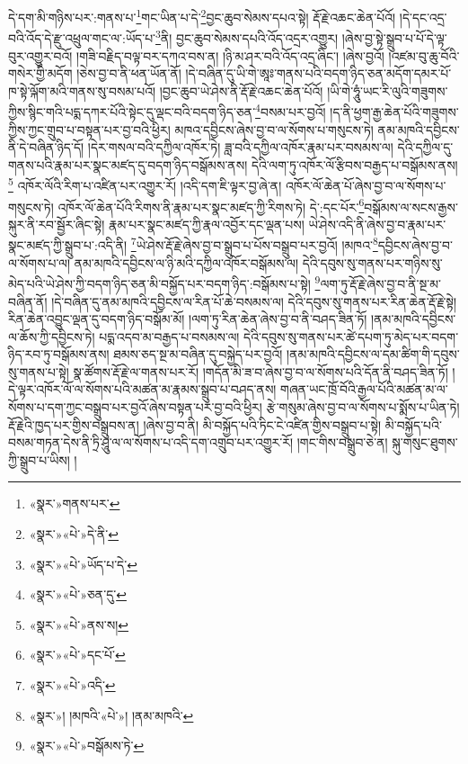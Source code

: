 དེ་དག་མི་གཉིས་པར་:གནས་པ་\footnote{«སྣར་»གནས་པར་}གང་ཡིན་པ་དེ་\footnote{«སྣར་»«པེ་»དེ་ནི་}བྱང་ཆུབ་སེམས་དཔའ་སྟེ། རྡོ་རྗེ་འཆང་ཆེན་པོའོ། །དེ་དང་འདྲ་བའི་འོད་དེ་རྫུ་འཕྲུལ་གང་ལ་:ཡོད་པ་\footnote{«སྣར་»«པེ་»ཡོད་པ་དེ་}ནི། བྱང་ཆུབ་སེམས་དཔའི་འོད་འདྲར་འགྱུར། །ཞེས་བྱ་སྟེ་སྒྲུབ་པ་པོ་དེ་ལྟ་བུར་འགྱུར་བའོ། །གཟི་བརྗིད་བལྟ་བར་དཀའ་བས་ན། །ཉི་མ་ཤར་བའི་འོད་འདྲ་ཞིང་། །ཞེས་བྱའོ། །འཛམ་བུ་ཆུ་བོའི་གསེར་གྱི་མདོག །ཅེས་བྱ་བ་ནི་ཕན་ཡོན་ནོ། །དེ་བཞིན་དུ་ཡི་གེ་ཨཱཿ་གནས་པའི་བདག་ཉིད་ཅན་མདོག་དམར་པོ་ཁ་སྟེ་ལྐོག་མའི་གནས་སུ་བསམ་པའོ། །བྱང་ཆུབ་ཡེ་ཤེས་ནི་རྡོ་རྗེ་འཆང་ཆེན་པོའོ། །ཡི་གེ་ཧཱུཾ་ཡང་རི་ལུའི་གཟུགས་ཀྱིས་སྙིང་གའི་པདྨ་དཀར་པོའི་སྟེང་དུ་ལྡང་བའི་བདག་ཉིད་ཅན་\footnote{«སྣར་»«པེ་»ཅན་དུ་}བསམ་པར་བྱའོ། །ད་ནི་ཕྱག་རྒྱ་ཆེན་པོའི་གཟུགས་ཀྱིས་ཀྱང་གྲུབ་པ་བསྟན་པར་བྱ་བའི་ཕྱིར། མཁའ་དབྱིངས་ཞེས་བྱ་བ་ལ་སོགས་པ་གསུངས་ཏེ། ནམ་མཁའི་དབྱིངས་ནི་དེ་བཞིན་ཉིད་དོ། །དེར་གསལ་བའི་དཀྱིལ་འཁོར་ཏེ། ཟླ་བའི་དཀྱིལ་འཁོར་རྣམ་པར་བསམས་ལ། དེའི་དཀྱིལ་དུ་གནས་པའི་རྣམ་པར་སྣང་མཛད་དུ་བདག་ཉིད་བསྒོམས་ནས། དེའི་ལག་ཏུ་འཁོར་ལོ་རྩིབས་བརྒྱད་པ་བསྒོམས་ནས།\footnote{«སྣར་»«པེ་»ནས་ས།} འཁོར་ལོའི་རིག་པ་འཛིན་པར་འགྱུར་རོ། །འདི་དག་ཇི་ལྟར་བྱ་ཞེ་ན། འཁོར་ལོ་ཆེན་པོ་ཞེས་བྱ་བ་ལ་སོགས་པ་གསུངས་ཏེ། འཁོར་ལོ་ཆེན་པོའི་རིགས་ནི་རྣམ་པར་སྣང་མཛད་ཀྱི་རིགས་ཏེ། དེ་:དང་པོར་\footnote{«སྣར་»«པེ་»དང་པོ་}བསྒོམས་ལ་སངས་རྒྱས་སྐུར་ནི་རབ་སྦྱོར་ཞིང་སྟེ། རྣམ་པར་སྣང་མཛད་ཀྱི་རྣལ་འབྱོར་དང་ལྡན་པས། ཡེ་ཤེས་འདི་ནི་ཞེས་བྱ་བ་རྣམ་པར་སྣང་མཛད་ཀྱི་སྒྲུབ་པ་:འདི་ནི། \footnote{«སྣར་»«པེ་»འདི་}ཡེ་ཤེས་རྡོ་རྗེ་ཞེས་བྱ་བ་སྒྲུབ་པ་པོས་བསྒྲུབ་པར་བྱའོ། །མཁའ་\footnote{«སྣར་»། །མཁའི་«པེ་»། །ནམ་མཁའི་}དབྱིངས་ཞེས་བྱ་བ་ལ་སོགས་པ་ལ། ནམ་མཁའི་དབྱིངས་ལ་ཉི་མའི་དཀྱིལ་འཁོར་བསྒོམས་ལ། དེའི་དབུས་སུ་གནས་པར་གཉིས་སུ་མེད་པའི་ཡེ་ཤེས་ཀྱི་བདག་ཉིད་ཅན་མི་བསྐྱོད་པར་བདག་ཉིད་:བསྒོམས་པ་སྟེ། \footnote{«སྣར་»«པེ་»བསྒོམས་ཏེ་}ལག་ཏུ་རྡོ་རྗེ་ཞེས་བྱ་བ་ནི་སྔ་མ་བཞིན་ནོ། །དེ་བཞིན་དུ་ནམ་མཁའི་དབྱིངས་ལ་རིན་པོ་ཆེ་བསམས་ལ། དེའི་དབུས་སུ་གནས་པར་རིན་ཆེན་རྡོ་རྗེ་སྟེ། རིན་ཆེན་འབྱུང་ལྡན་དུ་བདག་ཉིད་བསྒོམ་མོ། །ལག་ཏུ་རིན་ཆེན་ཞེས་བྱ་བ་ནི་བཤད་ཟིན་ཏོ། །ནམ་མཁའི་དབྱིངས་ལ་ཆོས་ཀྱི་དབྱིངས་ཏེ། པདྨ་འདབ་མ་བརྒྱད་པ་བསམས་ལ། དེའི་དབུས་སུ་གནས་པར་ཚེ་དཔག་ཏུ་མེད་པར་བདག་ཉིད་རབ་ཏུ་བསྒོམས་ནས། ཐམས་ཅད་སྔ་མ་བཞིན་དུ་བསྐྱེད་པར་བྱའོ། །ནམ་མཁའི་དབྱིངས་ལ་དམ་ཚིག་གི་དབུས་སུ་གནས་པ་སྟེ། སྣ་ཚོགས་རྡོ་རྗེ་ལ་གནས་པར་རོ། །གདོན་མི་ཟ་བ་ཞེས་བྱ་བ་ལ་སོགས་པའི་དོན་ནི་བཤད་ཟིན་ཏོ། །དེ་ལྟར་འཁོར་ལོ་ལ་སོགས་པའི་མཚན་མ་རྣམས་སྒྲུབ་པ་བཤད་ནས། གཞན་ཡང་ཁྲོ་བོའི་རྒྱལ་པོའི་མཚན་མ་ལ་སོགས་པ་དག་ཀྱང་བསྒྲུབ་པར་བྱའོ་ཞེས་བསྟན་པར་བྱ་བའི་ཕྱིར། རྩེ་གསུམ་ཞེས་བྱ་བ་ལ་སོགས་པ་སྨོས་པ་ཡིན་ཏེ། རྡོ་རྗེའི་ཁྱད་པར་གྱིས་བསྒྲུབས་ན། །ཞེས་བྱ་བ་ནི། མི་བསྐྱོད་པའི་ཏིང་ངེ་འཛིན་གྱིས་བསྒྲུབ་པ་སྟེ། མི་བསྐྱོད་པའི་བསམ་གཏན་དེས་ནི་ཏྲི་ཤཱུ་ལ་ལ་སོགས་པ་འདི་དག་འགྲུབ་པར་འགྱུར་རོ། །གང་གིས་བསྒྲུབ་ཅེ་ན། སྐུ་གསུང་ཐུགས་ཀྱི་སྒྲུབ་པ་ཡིས། །
